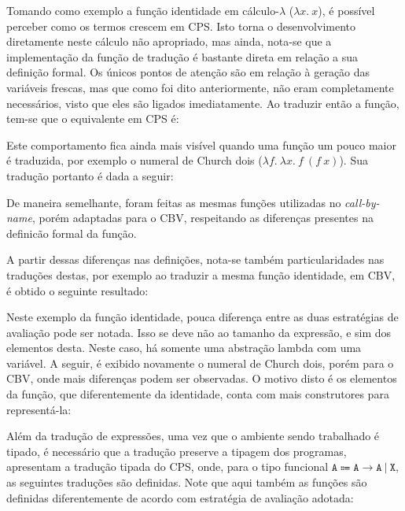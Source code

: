 Tomando como exemplo a função identidade em cálculo-$\lambda$ ($\lambda x.\ x$), é possível perceber como os termos crescem em CPS.
Isto torna o desenvolvimento diretamente neste cálculo não apropriado, mas ainda, nota-se que a implementação da função de tradução é bastante direta em relação a sua definição formal.
Os únicos pontos de atenção são em relação à geração das variáveis frescas, mas que como foi dito anteriormente, não eram completamente necessários, visto que eles são ligados imediatamente.
Ao traduzir então a função, tem-se que o equivalente em CPS é:

Este comportamento fica ainda mais visível quando uma função um pouco maior é traduzida, por exemplo o numeral de Church dois ($\lambda f.\ \lambda x.\ f\ (f\ x)$).
Sua tradução portanto é dada a seguir:

De maneira semelhante, foram feitas as mesmas funções utilizadas no \textit{call-by-name}, porém adaptadas para o CBV, respeitando as diferenças presentes na definicão formal da função.

A partir dessas diferenças nas definições, nota-se também particularidades nas traduções destas, por exemplo ao traduzir a mesma função identidade, em CBV, é obtido o seguinte resultado:

Neste exemplo da função identidade, pouca diferença entre as duas estratégias de avaliação pode ser notada.
Isso se deve não ao tamanho da expressão, e sim dos elementos desta.
Neste caso, há somente uma abstração lambda com uma variável.
A seguir, é exibido novamente o numeral de Church dois, porém para o CBV, onde mais diferenças podem ser observadas.
O motivo disto é os elementos da função, que diferentemente da identidade, conta com mais construtores para representá-la:


Além da tradução de expressões, uma vez que o ambiente sendo trabalhado é tipado, é necessário que a tradução preserve a tipagem dos programas,~ apresentam a tradução tipada do CPS, onde, para o tipo funcional $\mathtt{A \Coloneqq A \to A\ |\ X}$, as seguintes traduções são definidas.
Note que aqui também as funções são definidas diferentemente de acordo com estratégia de avaliação adotada:

